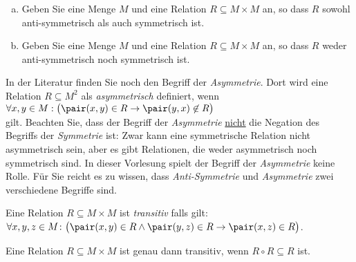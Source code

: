 \exercise
\begin{enumerate}[(a)]
\item Geben Sie eine Menge $M$ und eine Relation $R \subseteq M \times M$ an, so dass $R$
      sowohl anti-symmetrisch als auch symmetrisch ist.
\item Geben Sie eine Menge $M$ und eine Relation $R \subseteq M \times M$ an, so dass $R$
      weder anti-symmetrisch noch symmetrisch ist. \eox
\end{enumerate}

\remark
In der Literatur finden Sie noch den Begriff der \emph{Asymmetrie}.  Dort wird eine Relation 
$R \subseteq M^2$ als \emph{asymmetrisch} definiert, wenn 
\\[0.2cm]
\hspace*{1.3cm}
$\forall x, y \in M: \bigl(\pair(x,y) \in R \rightarrow \pair(y,x) \not\in R \bigr)$
\\[0.2cm]
gilt.  Beachten Sie, dass der Begriff der \emph{Asymmetrie} \underline{nicht} die Negation des Begriffs der
\emph{Symmetrie} ist:  Zwar kann eine symmetrische Relation nicht asymmetrisch sein, aber es gibt
Relationen, die weder asymmetrisch noch symmetrisch sind.  In dieser Vorlesung spielt der Begriff
der \emph{Asymmetrie} keine Rolle.  F\"{u}r Sie reicht es zu wissen, dass \emph{Anti-Symmetrie} und
\emph{Asymmetrie} zwei verschiedene Begriffe sind.
\eox

\begin{Definition}[transitiv]
Eine Relation $R \subseteq M \times M$  ist \emph{transitiv} falls gilt: \\[0.2cm]
\hspace*{1.3cm} 
$\forall x, y, z \in M \colon \bigl(\pair(x,y) \in R \wedge \pair(y,z) \in R \rightarrow \pair(x,z) \in R\bigr)$. 
\eox
\end{Definition}

\begin{Satz}
Eine Relation $R \subseteq M \times M$  ist genau dann transitiv, wenn
$R \circ R \subseteq R$ ist.
\end{Satz}


